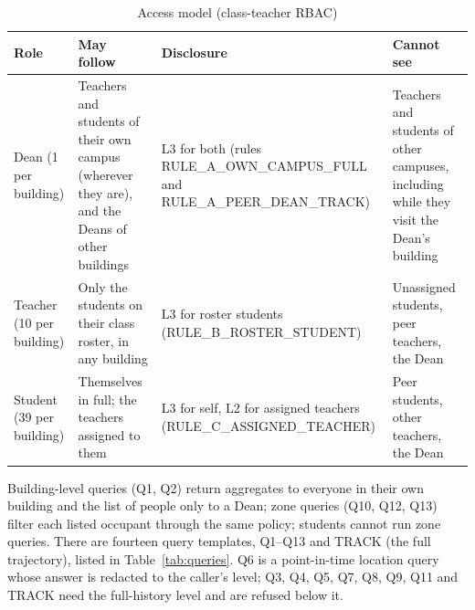 \documentclass[12pt,a4paper,oneside]{report}
\begin{document}
\begin{table}[htbp]
\centering
\caption{Access model (class-teacher RBAC)}\label{tab:access}
{\small\setlength{\tabcolsep}{4pt}\renewcommand{\arraystretch}{1.2}
\begin{tabular}{|p{2.49cm}|p{5.36cm}|p{2.87cm}|p{3.25cm}|}\hline
\textbf{Role} & \textbf{May follow} & \textbf{Disclosure} & \textbf{Cannot see}\\\hline
Dean (1 per building) & Teachers and students of their own campus (wherever they are), and the Deans of other buildings & L3 for both (rules RULE\_\allowbreak A\_\allowbreak OWN\_\allowbreak CAMPUS\_\allowbreak FULL and RULE\_\allowbreak A\_\allowbreak PEER\_\allowbreak DEAN\_\allowbreak TRACK) & Teachers and students of other campuses, including while they visit the Dean's building\\\hline
Teacher (10 per building) & Only the students on their class roster, in any building & L3 for roster students (RULE\_\allowbreak B\_\allowbreak ROSTER\_\allowbreak STUDENT) & Unassigned students, peer teachers, the Dean\\\hline
Student (39 per building) & Themselves in full; the teachers assigned to them & L3 for self, L2 for assigned teachers (RULE\_\allowbreak C\_\allowbreak ASSIGNED\_\allowbreak TEACHER) & Peer students, other teachers, the Dean\\\hline
\end{tabular}}
\end{table}

Building-level queries (Q1, Q2) return aggregates to everyone in their own building and the list of people only to a Dean; zone queries (Q10, Q12, Q13) filter each listed occupant through the same policy; students cannot run zone queries. There are fourteen query templates, Q1--Q13 and TRACK (the full trajectory), listed in Table~\ref{tab:queries}. Q6 is a point-in-time location query whose answer is redacted to the caller's level; Q3, Q4, Q5, Q7, Q8, Q9, Q11 and TRACK need the full-history level and are refused below it.
\end{document}
